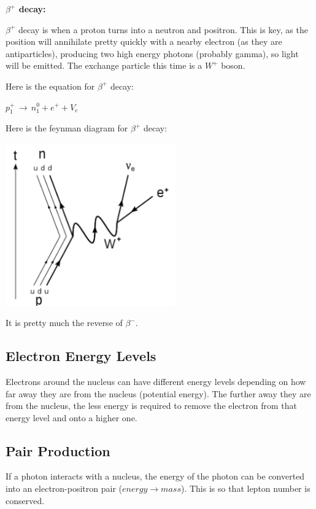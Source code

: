 \documentclass[a4paper, 12pt]{article}
\begin{document}
\textbf{$\beta^+$ decay:}

$\beta^+$ decay is when a proton turns into a neutron and positron. This is key, as the position will annihilate pretty quickly with a nearby electron (as they are antiparticles), producing two high energy photons (probably gamma), so light will be emitted. The exchange particle this time is a $W^+$ boson.

Here is the equation for $\beta^+$ decay:

$p^+_1 \, \rightarrow \, n^0_1 + e^+ + V_e$

Here is the feynman diagram for $\beta^+$ decay:

\begin{center}
\includegraphics[height=7cm]{betaPlus.png}
\end{center}

It is pretty much the reverse of $\beta^-$.

\subsection{Electron Energy Levels}

Electrons around the nucleus can have different energy levels depending on how far away they are from the nucleus (potential energy). The further away they are from the nucleus, the less energy is required to remove the electron from that energy level and onto a higher one.

\subsection{Pair Production}

If a photon interacts with a nucleus, the energy of the photon can be converted into an electron-positron pair ($energy \rightarrow mass$). This is so that lepton number is conserved.
\end{document}
